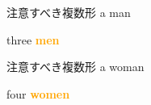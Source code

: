 \documentclass[aspectratio=169,xcolor={dvipsnames,table}]{beamer}
\newcommand{\myaudio}[1]{\href{#1}{\faVolumeUp}}
\begin{document}
\begin{frame}[plain]{注意すべき複数形}
\scalebox{5}{\ManFace}\hspace{15pt}
\pause
{\LARGE a man}\pause{}
\pause

\bigskip

\bigskip

\scalebox{5}{\ManFace\hspace{5pt}\ManFace\hspace{5pt}\ManFace}\hspace{15pt}
\pause
{\LARGE three  \textcolor{orange}{\bfseries men}}\pause{}

\bigskip

\bigskip

\mbox{}\hfill\myaudio{./audio/005_singular_plural_08.mp3}
\end{frame}
\begin{frame}[plain]{注意すべき複数形}
\scalebox{5}{\WomanFace}\pause\hspace{15pt} {\LARGE a woman}%
\pause{}
\pause

\bigskip

\bigskip

\scalebox{5}{\WomanFace \WomanFace \WomanFace \WomanFace} \hspace{25pt}
\pause
{\LARGE four  \textcolor{orange}{\bfseries women}}%
\pause{}

\bigskip

\bigskip

\mbox{}\hfill\myaudio{./audio/005_singular_plural_09.mp3}
\end{frame}
\end{document}

